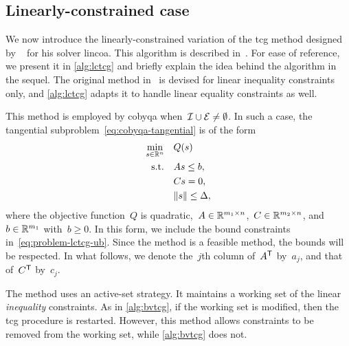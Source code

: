 
\subsection{Linearly-constrained case}
\label{subsec:lctcg}

We now introduce the linearly-constrained variation of the \gls{tcg} method designed by \citeauthor{Powell_2015}~\cite{Powell_2015} for his solver \gls{lincoa}.
This algorithm is described in~\cite[\S~3,\S~5]{Powell_2015}.
For ease of reference, we present it in \cref{alg:lctcg} and briefly explain the idea behind the algorithm in the sequel.
The original method in~\cite{Powell_2015} is devised for linear inequality constraints only, and \cref{alg:lctcg} adapts it to handle linear equality constraints as well.

This method is employed by \gls{cobyqa} when~$\mathcal{I} \cup \mathcal{E} \neq \emptyset$.
In such a case, the tangential subproblem~\cref{eq:cobyqa-tangential} is of the form
\begin{subequations}
    \label{eq:problem-lctcg}
    \begin{align}
        \min_{\sstep \in \R^n}  & \quad Q(\sstep)\\
        \text{s.t.}             & \quad A \sstep \le b, \label{eq:problem-lctcg-ub}\\
                                & \quad C \sstep = 0,\\
                                & \quad \norm{\sstep} \le \rad,
    \end{align}
\end{subequations}
where the objective function~$Q$ is quadratic,~$A \in \mathbb{R}^{m_1 \times n}$,~$C \in \mathbb{R}^{m_2 \times n}$, and~$b \in \mathbb{R}^{m_1}$ with~$b \ge 0$.
In this form, we include the bound constraints in~\cref{eq:problem-lctcg-ub}.
Since the method is a feasible method, the bounds will be respected.
In what follows, we denote the~$j$th column of~$A^{\mathsf{T}}$ by~$a_j$, and that of~$C^{\mathsf{T}}$ by~$c_j$.

The method uses an active-set strategy.
It maintains a working set of the linear \emph{inequality} constraints.
As in \cref{alg:bvtcg}, if the working set is modified, then the \gls{tcg} procedure is restarted.
However, this method allows constraints to be removed from the working set, while \cref{alg:bvtcg} does not.

